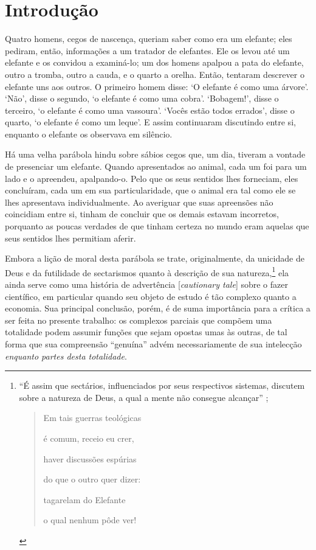 \chapter{Introdução}

\setlength{\epigraphwidth}{0.6\textwidth}

\epigraph{Quatro homens, cegos de nascença, queriam saber como era um elefante; eles pediram, então, informações a um tratador de elefantes. Ele os levou até um elefante e os convidou a examiná-lo; um dos homens apalpou a pata do elefante, outro a tromba, outro a cauda, e o quarto a orelha. Então, tentaram descrever o elefante uns aos outros. O primeiro homem disse: `O elefante é como uma árvore'. `Não', disse o segundo, `o elefante é como uma cobra'. `Bobagem!', disse o terceiro, `o elefante é como uma vassoura'. `Vocês estão todos errados', disse o quarto, `o elefante é como um leque'. E assim continuaram discutindo entre si, enquanto o elefante os observava em silêncio.}{\textcite[p. vii]{Johnstone2002}}


Há uma velha parábola hindu sobre sábios cegos que, um dia, tiveram a vontade de presenciar um elefante. Quando apresentados ao animal, cada um foi para um lado e o apreendeu, apalpando-o. Pelo que os seus sentidos lhes forneciam, eles concluíram, cada um em sua particularidade, que o animal era tal como ele se lhes apresentava individualmente. Ao averiguar que suas apreensões não coincidiam entre si, tinham de concluir que os demais estavam incorretos, porquanto as poucas verdades de que tinham certeza no mundo eram aquelas que seus sentidos lhes permitiam aferir. 

Embora a lição de moral desta parábola se trate, originalmente, da unicidade de Deus e da futilidade de sectarismos quanto à descrição de sua natureza,\footnote{``É assim que sectários, influenciados por seus respectivos sistemas, discutem sobre a natureza de Deus, a qual a mente não consegue alcançar'' \parencite[p. 30]{Robinson1885}; 
\begin{quote}
    Em tais guerras teológicas
    
    é comum, receio eu crer,
    
    haver discussões espúrias 
    
    do que o outro quer dizer:
    
    tagarelam do Elefante
    
    o qual nenhum pôde ver! \parencite[tradução e escansão minhas]{Saxe1872}
\end{quote}}
ela ainda serve como uma história de advertência [\textit{cautionary tale}] sobre o fazer científico, em particular quando seu objeto de estudo é tão complexo quanto a economia. Sua principal conclusão, porém, é de suma importância para a crítica a ser feita no presente trabalho: os complexos parciais que compõem uma totalidade podem assumir funções que sejam opostas umas às outras, de tal forma que sua compreensão ``genuína'' advém necessariamente de sua intelecção \textit{enquanto partes desta totalidade}. 

